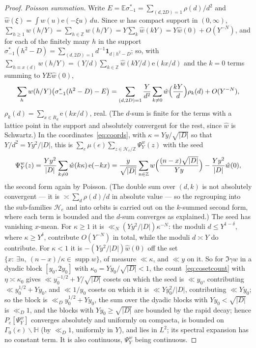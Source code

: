 \documentclass[11pt,a4paper]{article}
\theoremstyle{remark}\newtheorem{remark}[theorem]{Remark}
\newcommand{\Z}{\mathbb Z}\newcommand{\R}{\mathbb R}\newcommand{\Q}{\mathbb Q}\newcommand{\C}{\mathbb C}
\newcommand{\e}{\mathrm e}\newcommand{\Off}{\mathrm{Off}}\newcommand{\rep}[2]{\langle #1\rangle_{#2}}
\begin{document}
\begin{proof}
\emph{Poisson summation.} Write $E=\mathbb E\sigma^*_{-1}=\sum_{(d,2D)=1}\rho(d)/d^2$ and
$\hat w(\xi)=\int w(u)\e(-\xi u)\,du$. Since $w$ has compact support in $(0,\infty)$,
$\sum_{h\ge1}w(h/Y)=\sum_{h\in\Z}w(h/Y)=Y\sum_k\hat w(kY)=Y\hat w(0)+O(Y^{-N})$, and for each of the finitely many $h$
in the support $\sigma^*_{-1}(h^2-D)=\sum_{(d,2D)=1}d^{-1}\mathbf 1_{d\mid h^2-D}$; so, with
$\sum_{h\equiv x\,(d)}w(h/Y)=(Y/d)\sum_{k\in\Z}\hat w(kY/d)\e(kx/d)$ and the $k=0$ terms summing to $YE\hat w(0)$,
\[
\sum_hw(h/Y)\bigl(\sigma^*_{-1}(h^2-D)-E\bigr)=\sum_{(d,2D)=1}\frac Y{d^2}\sum_{k\ne0}\hat w\Bigl(\frac{kY}d\Bigr)\rho_k(d)+O(Y^{-N}),
\]
$\rho_k(d)=\sum_{x\in R_d}\e(kx/d)$, real. (The $d$-sum is finite for the terms with a lattice point in the support and
absolutely convergent for the rest, since $\hat w$ is Schwartz.) In the coordinates~\eqref{eq:coords}, with
$\kappa=Yy/\sqrt{|D|}$ so that $Y/d^2=Yy^2/|D|$, this is $\sum_e\mu(e)\sum_{z\in\mathcal H_e/\Z}\Psi^w_Y(z)$ with the seed
\[
\Psi^w_Y(z)=\frac{Yy^2}{|D|}\sum_{k\ne0}\hat w(k\kappa)\,\e(-kx)=\frac{y}{\sqrt{|D|}}\sum_{n\in\Z}w\Bigl(\frac{(n-x)\sqrt{|D|}}{Yy}\Bigr)-\frac{Yy^2}{|D|}\hat w(0),
\]
the second form again by Poisson. (The double sum over $(d,k)$ is not absolutely convergent --- it is
$\asymp\sum_d\rho(d)/d$ in absolute value --- so the regrouping into the sub-families $\mathcal H_e$ and into orbits is
carried out on the $k$-summed second form, where each term is bounded and the $d$-sum converges as explained.) The seed
has vanishing $x$-mean. For $\kappa\ge1$ it is $\ll_N(Yy^2/|D|)\kappa^{-N}$: the moduli $d\le Y^{1-\delta}$, where
$\kappa\ge Y^{\delta}$, contribute $O(Y^{-N})$ in total, while the moduli $d\asymp Y$ do contribute. For $\kappa<1$ it is
$-(Yy^2/|D|)\hat w(0)$ off the set $\{x:\ \exists n,\ (n-x)/\kappa\in\operatorname{supp}w\}$, of measure $\ll\kappa$, and $\ll y$ on
it. So for $\Im\gamma w$ in a dyadic block $[y_0,2y_0]$ with $\kappa_0=Yy_0/\sqrt{|D|}<1$, the count~\eqref{eq:cosetcount}
with $\eta\asymp\kappa_0$ gives $\ll y_0^{-1/2}+Y/\sqrt{|D|}$ cosets on which the seed is $\ll y_0$, contributing
$\ll y_0^{1/2}+Yy_0$, and $\ll1/y_0$ cosets on which it is $\ll Yy_0^2/|D|$, contributing $\ll Yy_0$; so the block is
$\ll_D y_0^{1/2}+Yy_0$, the sum over the dyadic blocks with $Yy_0<\sqrt{|D|}$ is $\ll_D1$, and the blocks with
$Yy_0\ge\sqrt{|D|}$ are bounded by the rapid decay; hence $P_e[\Psi^w_Y]$ converges absolutely and uniformly on compacta,
is bounded on $\Gamma_0(e)\backslash\mathbb H$ (by $\ll_D1$, uniformly in $Y$), and lies in $L^2$; its spectral expansion
has no constant term. It is also continuous, $\Psi^w_Y$ being continuous.


\end{proof}
\end{document}
